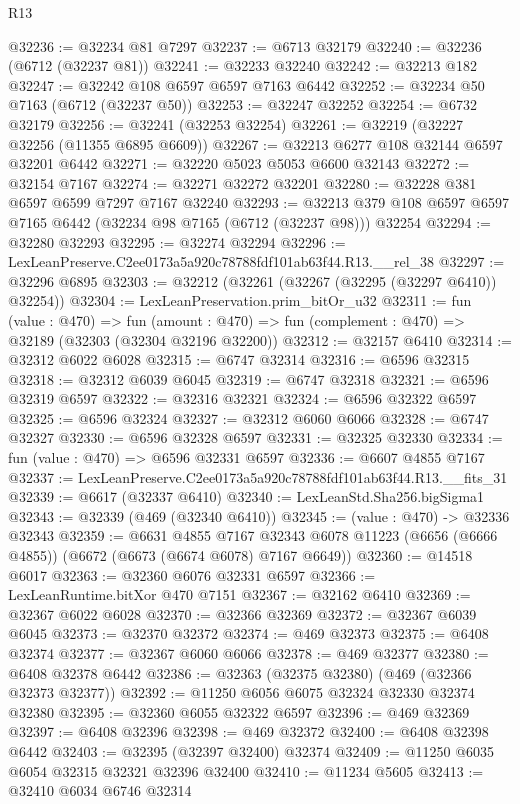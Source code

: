 \begin{lexlean}{R13}
\begin{coremodule}
@32236 := @32234 @81 @7297
@32237 := @6713 @32179
@32240 := @32236 (@6712 (@32237 @81))
@32241 := @32233 @32240
@32242 := @32213 @182
@32247 := @32242 @108 @6597 @6597 @7163 @6442
@32252 := @32234 @50 @7163 (@6712 (@32237 @50))
@32253 := @32247 @32252
@32254 := @6732 @32179
@32256 := @32241 (@32253 @32254)
@32261 := @32219 (@32227 @32256 (@11355 @6895 @6609))
@32267 := @32213 @6277 @108 @32144 @6597 @32201 @6442
@32271 := @32220 @5023 @5053 @6600 @32143
@32272 := @32154 @7167
@32274 := @32271 @32272 @32201
@32280 := @32228 @381 @6597 @6599 @7297 @7167 @32240
@32293 := @32213 @379 @108 @6597 @6597 @7165 @6442 (@32234 @98 @7165 (@6712 (@32237 @98))) @32254
@32294 := @32280 @32293
@32295 := @32274 @32294
@32296 := LexLeanPreserve.C2ee0173a5a920c78788fdf101ab63f44.R13.__rel_38
@32297 := @32296 @6895
@32303 := @32212 (@32261 (@32267 (@32295 (@32297 @6410)) @32254))
@32304 := LexLeanPreservation.prim_bitOr_u32
@32311 := fun (value : @470) =>
  fun (amount : @470) => fun (complement : @470) => @32189 (@32303 (@32304 @32196 @32200))
@32312 := @32157 @6410
@32314 := @32312 @6022 @6028
@32315 := @6747 @32314
@32316 := @6596 @32315
@32318 := @32312 @6039 @6045
@32319 := @6747 @32318
@32321 := @6596 @32319 @6597
@32322 := @32316 @32321
@32324 := @6596 @32322 @6597
@32325 := @6596 @32324
@32327 := @32312 @6060 @6066
@32328 := @6747 @32327
@32330 := @6596 @32328 @6597
@32331 := @32325 @32330
@32334 := fun (value : @470) => @6596 @32331 @6597
@32336 := @6607 @4855 @7167
@32337 := LexLeanPreserve.C2ee0173a5a920c78788fdf101ab63f44.R13.__fits_31
@32339 := @6617 (@32337 @6410)
@32340 := LexLeanStd.Sha256.bigSigma1
@32343 := @32339 (@469 (@32340 @6410))
@32345 := (value : @470) -> @32336 @32343
@32359 := @6631
    @4855
    @7167
    @32343
    @6078
    @11223
    (@6656 (@6666 @4855))
    (@6672 (@6673 (@6674 @6078) @7167 @6649))
@32360 := @14518 @6017
@32363 := @32360 @6076 @32331 @6597
@32366 := LexLeanRuntime.bitXor @470 @7151
@32367 := @32162 @6410
@32369 := @32367 @6022 @6028
@32370 := @32366 @32369
@32372 := @32367 @6039 @6045
@32373 := @32370 @32372
@32374 := @469 @32373
@32375 := @6408 @32374
@32377 := @32367 @6060 @6066
@32378 := @469 @32377
@32380 := @6408 @32378 @6442
@32386 := @32363 (@32375 @32380) (@469 (@32366 @32373 @32377))
@32392 := @11250 @6056 @6075 @32324 @32330 @32374 @32380
@32395 := @32360 @6055 @32322 @6597
@32396 := @469 @32369
@32397 := @6408 @32396
@32398 := @469 @32372
@32400 := @6408 @32398 @6442
@32403 := @32395 (@32397 @32400) @32374
@32409 := @11250 @6035 @6054 @32315 @32321 @32396 @32400
@32410 := @11234 @5605
@32413 := @32410 @6034 @6746 @32314

\end{coremodule}
\end{lexlean}
